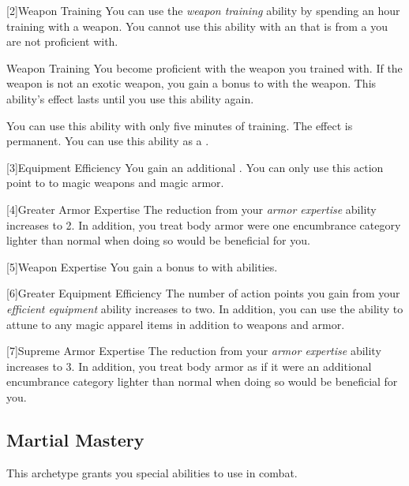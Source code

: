         [2]{Weapon Training} You can use the \textit{weapon training} ability by spending an hour training with a weapon.
        You cannot use this ability with an  that is from a  you are not proficient with.
        \begin{freeability}{Weapon Training}
            You become proficient with the weapon you trained with.
            If the weapon is not an exotic weapon, you gain a  bonus to  with the weapon.
            This ability's effect lasts until you use this ability again.

            \rankline
             You can use this ability with only five minutes of training.
             The effect is permanent.
             You can use this ability as a .
        \end{freeability}

        [3]{Equipment Efficiency} You gain an additional .
        You can only use this action point to  to magic weapons and magic armor.

        [4]{Greater Armor Expertise}
        The  reduction from your \textit{armor expertise} ability increases to 2.
        In addition, you treat body armor were one encumbrance category lighter than normal when doing so would be beneficial for you.

        [5]{Weapon Expertise} You gain a  bonus to  with  abilities.

        [6]{Greater Equipment Efficiency} The number of action points you gain from your \textit{efficient equipment} ability increases to two.
        In addition, you can use the ability to attune to any magic apparel items in addition to weapons and armor.

        [7]{Supreme Armor Expertise}
        The  reduction from your \textit{armor expertise} ability increases to 3.
        In addition, you treat body armor as if it were an additional encumbrance category lighter than normal when doing so would be beneficial for you.

    \subsection{Martial Mastery}
        This archetype grants you special abilities to use in combat.

